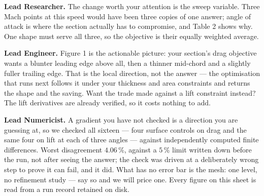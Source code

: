 \documentclass[9pt,a4paper]{article}
\renewcommand{\footnotesize}{\fontsize{6.4}{6.85}\selectfont}
\newcommand{\rolesig}[1]{\textbf{\footnotesize#1}}
\begin{document}
\vspace{1pt}
{\footnotesize
\rolesig{Lead Researcher.} The change worth your attention is the sweep
variable. Three Mach points at this speed would have been three copies of one
answer; angle of attack is where the section actually has to compromise, and
Table 2 shows why. One shape must serve all three, so the objective is their
equally weighted average.

\rolesig{Lead Engineer.} Figure 1 is the actionable picture: your section's
drag objective wants a blunter leading edge above all, then a thinner
mid-chord and a slightly fuller trailing edge. That is the local direction, not
the answer --- the optimisation that runs next follows it under your thickness
and area constraints and returns the shape and the saving. Want the trade made
against a lift constraint instead? The lift derivatives are already verified,
so it costs nothing to add.

\rolesig{Lead Numericist.} A gradient you have not checked is a direction you
are guessing at, so we checked all sixteen --- four surface controls on drag
and the same four on lift at each of three angles --- against independently
computed finite differences. Worst disagreement $4.06\,\%$, against a
$5\,\%$ limit written down before the run, not after seeing the answer; the
check was driven at a deliberately wrong step to prove it can fail, and it did.
What has no error bar is the mesh: one level, no refinement study --- say so and
we will price one. Every figure on this sheet is read from a run record
retained on disk.}
\end{document}
